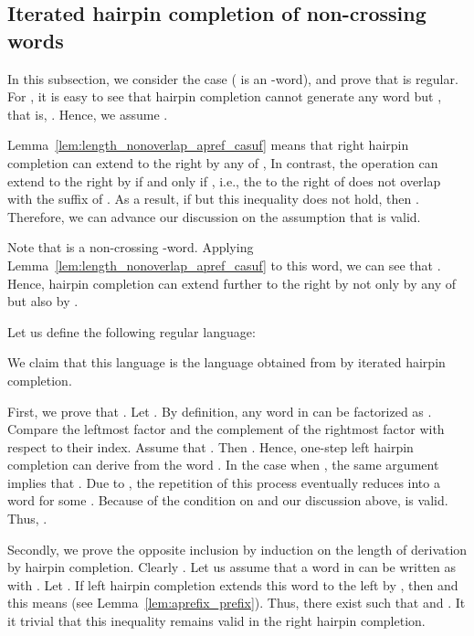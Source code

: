 \documentclass{article}
\theoremstyle{plain}
\theoremstyle{remark}
\begin{document}
\subsection{Iterated hairpin completion of  non-crossing words}

In this subsection, we consider the case  ( is an -word), and prove that  is regular. 
For , it is easy to see that hairpin completion cannot generate any word but , that is, . 
Hence, we assume . 

Lemma~\ref{lem:length_nonoverlap_apref_casuf} means that right hairpin completion can extend  to the right by any of , 
In contrast, the operation can extend  to the right by  if and only if , i.e., the  to the right of  does not overlap with the suffix  of . 
As a result, if  but this inequality does not hold, then . 
Therefore, we can advance our discussion on the assumption that  is valid. 

Note that  is a non-crossing -word. 
Applying Lemma~\ref{lem:length_nonoverlap_apref_casuf} to this word, we can see that . 
Hence, hairpin completion can extend  further to the right by not only by any of  but also by . 

Let us define the following regular language: 

We claim that this language is the language obtained from  by iterated hairpin completion. 

First, we prove that . 
Let . 
By definition, any word in  can be factorized as . 
Compare the leftmost factor  and the complement of the rightmost factor  with respect to their index. 
Assume that . 
Then . 
Hence, one-step left hairpin completion can derive  from the word . 
In the case when , the same argument implies that . 
Due to , the repetition of this process eventually reduces  into a word  for some . 
Because of the condition on  and our discussion above,  is valid. 
Thus, . 

Secondly, we prove the opposite inclusion by induction on the length of derivation by hairpin completion. 
Clearly . 
Let us assume that a word in  can be written as  with . 
Let . 
If left hairpin completion extends this word to the left by , then  and this means  (see Lemma~\ref{lem:aprefix_prefix}). 
Thus, there exist  such that  and . 
It it trivial that this inequality remains valid in the right hairpin completion.  
\end{document}
